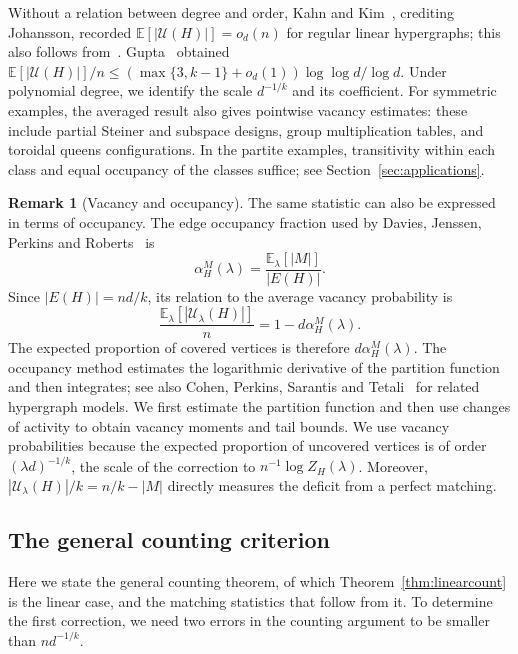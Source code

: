 \documentclass[11pt,reqno]{amsart}
\numberwithin{equation}{section}
\theoremstyle{plain}
\theoremstyle{definition}
\newtheorem{remark}[theorem]{Remark}
\newcommand{\E}{\mathbb E}
\newcommand{\calU}{\mathcal U}
\begin{document}
Without a relation between degree and order, Kahn and Kim~\cite[p.~204]{KK}, crediting Johansson, recorded $\E[|\calU(H)|]=o_d(n)$ for regular linear hypergraphs; this also follows from~\cite{AsratianKuzjurin}.
Gupta~\cite{Gupta} obtained $\E[|\calU(H)|]/n\le(\max\{3,k-1\}+o_d(1))\log\log d/\log d$.
Under polynomial degree, we identify the scale $d^{-1/k}$ and its coefficient.
For symmetric examples, the averaged result also gives pointwise vacancy estimates: these include partial Steiner and subspace designs, group multiplication tables, and toroidal queens configurations.
In the partite examples, transitivity within each class and equal occupancy of the classes suffice; see Section~\ref{sec:applications}.

\begin{remark}[Vacancy and occupancy]
The same statistic can also be expressed in terms of occupancy.
The edge occupancy fraction used by Davies, Jenssen, Perkins and Roberts~\cite{DJPR} is
\[
    \alpha_H^M(\lambda)=\frac{\E_\lambda[|M|]}{|E(H)|}.
\]
Since $|E(H)|=nd/k$, its relation to the average vacancy probability is
\begin{equation}\label{eq:occupancyvacancy}
    \frac{\E_\lambda[|\calU_\lambda(H)|]}{n}=1-d\alpha_H^M(\lambda).
\end{equation}
The expected proportion of covered vertices is therefore $d\alpha_H^M(\lambda)$.
The occupancy method estimates the logarithmic derivative of the partition function and then integrates; see also Cohen, Perkins, Sarantis and Tetali~\cite{CPST} for related hypergraph models.
We first estimate the partition function and then use changes of activity to obtain vacancy moments and tail bounds.
We use vacancy probabilities because the expected proportion of uncovered vertices is of order $(\lambda d)^{-1/k}$, the scale of the correction to $n^{-1}\log Z_H(\lambda)$.
Moreover, $|\calU_\lambda(H)|/k=n/k-|M|$ directly measures the deficit from a perfect matching.
\end{remark}


\subsection{The general counting criterion}\label{subsec:mainresults}

Here we state the general counting theorem, of which Theorem~\ref{thm:linearcount} is the linear case, and the matching statistics that follow from it.
To determine the first correction, we need two errors in the counting argument to be smaller than $nd^{-1/k}$.
\end{document}
